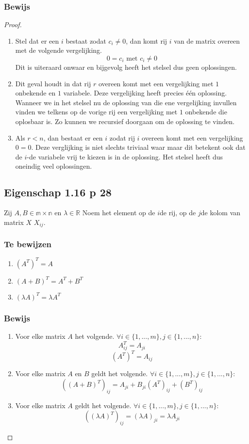 \documentclass[lineaire_algebra_oplossingen.tex]{subfiles}
\begin{document}
\subsubsection*{Bewijs}
\begin{proof}
\begin{enumerate}
\item Stel dat er een $i$ bestaat zodat $c_i \neq 0$, dan komt rij $i$ van de matrix overeen met de volgende vergelijking.
\[
0 = c_i \text{ met } c_i \neq 0
\]
Dit is uiteraard onwaar en bijgevolg heeft het stelsel dus geen oplossingen.
\item
Dit geval houdt in dat rij $r$ overeen komt met een vergelijking met $1$ onbekende en $1$ variabele. Deze vergelijking heeft precies \'e\'en oplossing. Wanneer we in het stelsel nu de oplossing van die ene vergelijking invullen vinden we telkens op de vorige rij een vergelijking met $1$ onbekende die oplosbaar is. Zo kunnen we recursief doorgaan om de oplossing te vinden.
\item
Als $r < n$, dan bestaat er een $i$ zodat rij $i$ overeen komt met een vergelijking $0=0$. Deze verglijking is niet slechts triviaal waar maar dit betekent ook dat de $i$-de variabele vrij te kiezen is in de oplossing. Het stelsel heeft dus oneindig veel oplossingen.
\end{enumerate}
\subsection{Eigenschap 1.16 p 28}
Zij $A,B\in \mathbb{m\times n}$ en $\lambda \in \mathbb{R}$
Noem het element op de $i$de rij, op de $j$de kolom van matrix $X$ $X_{ij}$.
\subsubsection*{Te bewijzen}
\begin{enumerate}
\item $(A^T)^T = A$
\item $(A+B)^T = A^T + B^T$
\item $(\lambda A)^T=\lambda A^T$
\end{enumerate}
\subsubsection*{Bewijs}
\begin{enumerate}
\item Voor elke matrix $A$ het volgende. $\forall i\in \{1,...,m\} ,j \in \{1,...,n\}:$
\[
A^T_{ij} = A_{ji}
\]
\[
(A^T)^T = A_{ij}
\]
\item Voor elke matrix $A$ en $B$ geldt het volgende. $\forall i\in \{1,...,m\} ,j \in \{1,...,n\}:$
\[
((A+B)^T)_{ij} = A_{ji}+B_{ji}(A^T)_{ij} + (B^T)_{ij}
\]
\item Voor elke matrix $A$ geldt het volgende. $\forall i\in \{1,...,m\} ,j \in \{1,...,n\}:$
\[
((\lambda A)^T)_{ij} = (\lambda A)_{ji} = \lambda A_{ji}
\]
\end{enumerate}
\end{proof}
\end{document}
